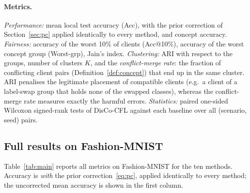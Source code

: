 \paragraph{Metrics.} \emph{Performance:} mean local test accuracy (Acc), with the prior correction of Section~\ref{sec:pc} applied identically to every method, and concept accuracy. \emph{Fairness:} accuracy of the worst 10\% of clients (Acc@10\%), accuracy of the worst concept group (Worst-grp), Jain's index. \emph{Clustering:} ARI with respect to the groups, number of clusters $K$, and the \emph{conflict-merge rate}: the fraction of conflicting client pairs (Definition~\ref{def:concept}) that end up in the same cluster. ARI penalises the legitimate placement of compatible clients (e.g.\ a client of a label-swap group that holds none of the swapped classes), whereas the conflict-merge rate measures exactly the harmful errors. \emph{Statistics:} paired one-sided Wilcoxon signed-rank tests of DisCo-CFL against each baseline over all (scenario, seed) pairs.

\subsection{Full results on Fashion-MNIST}\label{sec:fullfmnist}
Table~\ref{tab:main} reports all metrics on Fashion-MNIST for the ten methods. Accuracy is \emph{with} the prior correction~\eqref{eq:pc}, applied identically to every method; the uncorrected mean accuracy is shown in the first column.

\begin{table}[!htbp]
\centering
\caption{Fashion-MNIST, 40 clients, 3 seeds. Acc: mean local accuracy (with prior correction, $\pm$ std over seeds). Acc (raw): without correction. Acc@10\%: mean accuracy of the worst 10\% of clients. Worst-grp: accuracy of the worst concept group. Concept: accuracy on the class-balanced test set of the client's concept. Conflict\%: fraction of conflicting client pairs merged into one cluster (lower is better). IFCA, FeSEM, FL+HC and PACFL receive the true $K$; DisCo-CFL finds it. Oracle uses the ground-truth groups. Best non-oracle values in bold.}\label{tab:main}

\end{table}

\begin{table}[!htbp]
\centering
\caption*{Table~\ref{tab:main} (continued).}

\end{table}

